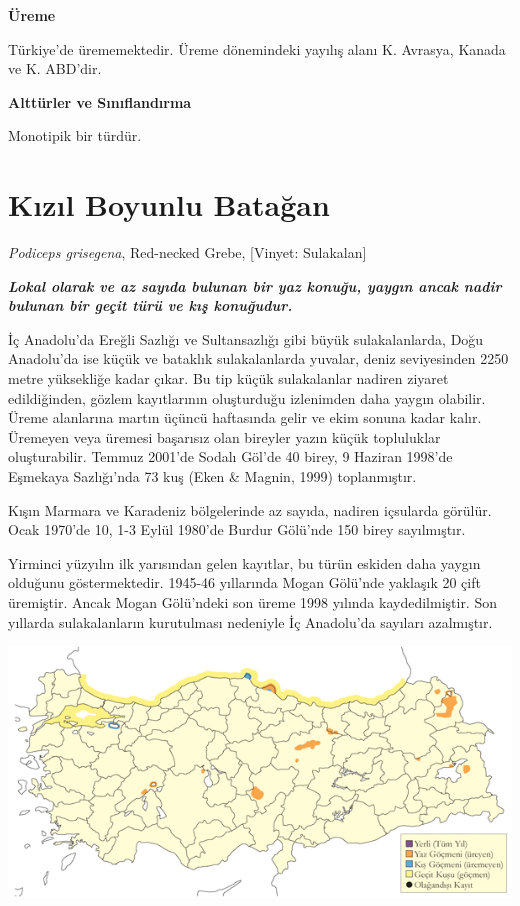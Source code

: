 \documentclass[
  a4paper,
  DIV=11,
  numbers=noendperiod]{scrreprt}
\begin{document}
\textbf{Üreme}

Türkiye'de ürememektedir. Üreme dönemindeki yayılış alanı K. Avrasya,
Kanada ve K. ABD'dir.

\textbf{Alttürler ve Sınıflandırma}

Monotipik bir türdür.

\section{Kızıl Boyunlu Batağan}\label{kux131zux131l-boyunlu-bataux11fan}

\emph{Podiceps grisegena}, Red-necked Grebe, {[}Vinyet: Sulakalan{]}

\textbf{\emph{Lokal olarak ve az sayıda bulunan bir yaz konuğu, yaygın
ancak nadir bulunan bir geçit türü ve kış konuğudur.}}

İç Anadolu'da Ereğli Sazlığı ve Sultansazlığı gibi büyük sulakalanlarda,
Doğu Anadolu'da ise küçük ve bataklık sulakalanlarda yuvalar, deniz
seviyesinden 2250 metre yüksekliğe kadar çıkar. Bu tip küçük
sulakalanlar nadiren ziyaret edildiğinden, gözlem kayıtlarının
oluşturduğu izlenimden daha yaygın olabilir. Üreme alanlarına martın
üçüncü haftasında gelir ve ekim sonuna kadar kalır. Üremeyen veya
üremesi başarısız olan bireyler yazın küçük topluluklar oluşturabilir.
Temmuz 2001'de Sodalı Göl'de 40 birey, 9 Haziran 1998'de Eşmekaya
Sazlığı'nda 73 kuş (Eken \& Magnin, 1999) toplanmıştır.

Kışın Marmara ve Karadeniz bölgelerinde az sayıda, nadiren içsularda
görülür. Ocak 1970'de 10, 1-3 Eylül 1980'de Burdur Gölü'nde 150 birey
sayılmıştır.

Yirminci yüzyılın ilk yarısından gelen kayıtlar, bu türün eskiden daha
yaygın olduğunu göstermektedir. 1945-46 yıllarında Mogan Gölü'nde
yaklaşık 20 çift üremiştir. Ancak Mogan Gölü'ndeki son üreme 1998
yılında kaydedilmiştir. Son yıllarda sulakalanların kurutulması
nedeniyle İç Anadolu'da sayıları azalmıştır.

\includegraphics{images/harita_Page_052.png}
\end{document}
